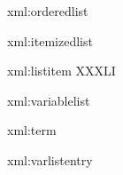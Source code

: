 
\startxmlsetups xml:orderedlist
	\startitemize[n]
	\stopitemize
\stopxmlsetups

\startxmlsetups xml:itemizedlist
	\startitemize[1]
	\stopitemize
\stopxmlsetups

\startxmlsetups xml:listitem
XXXLI
\stopxmlsetups


\startxmlsetups xml:variablelist
\stopxmlsetups

\startxmlsetups xml:term
\stopxmlsetups

\startxmlsetups xml:varlistentry
	\stopvariablelist
\stopxmlsetups

